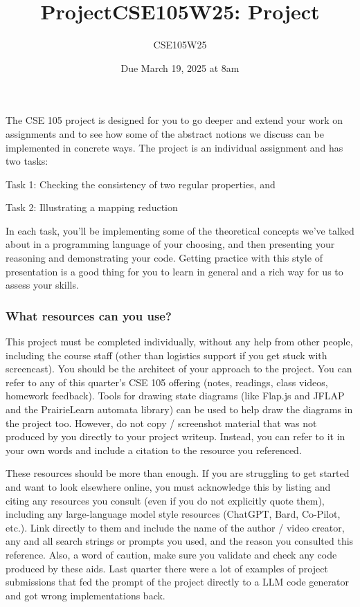 \documentclass[12pt, oneside]{article}
\author{CSE105W25}
\title{ProjectCSE105W25: Project}
\date{Due March 19, 2025 at 8am}
\begin{document}
\maketitle

\thispagestyle{fancy}


\vspace{-20pt}

The CSE 105 project is designed for you to go deeper and 
extend your work on assignments 
and to see how some of the abstract notions we discuss can 
be implemented in concrete ways. 
The project is an individual assignment and has two tasks: 

Task 1: Checking the consistency of two regular properties, and

\vspace{-15pt}

Task 2: Illustrating a mapping reduction

In each task, you'll be implementing some of the theoretical concepts we've talked about in a programming language of your choosing, and then presenting your reasoning and demonstrating your code. Getting practice with this 
style of presentation is a good thing  for you to learn in general and a rich 
way for us to assess your skills. 

\vspace{-20pt}

\subsubsection*{What resources can you use?} This project must be completed individually, 
without any help from other people, including the course staff (other than logistics support if 
you get stuck with screencast). You should be the architect of your approach to the project.
You can refer to any of this quarter's CSE 105 offering (notes, readings, class videos, homework feedback). 
Tools for drawing state diagrams (like Flap.js and JFLAP and the PrairieLearn automata library) can be used to help draw the diagrams 
in the project too. However, do not copy / screenshot material that was not produced by you directly to your project writeup. Instead, you can refer to it in your own words and include a citation to the resource you referenced.

These resources should be more than enough.
If you are struggling to get started and want to look elsewhere online, 
you must acknowledge this by listing and citing any resources you consult 
(even if you do not explicitly quote them), including any large-language model style resources (ChatGPT, Bard, Co-Pilot, etc.). 
Link directly to them and include the name of the author / video creator, 
any and all search strings or prompts you used, and the reason you consulted this reference.  Also, a word of caution, make sure you validate and check 
any code produced by these aids. Last quarter there were a lot of examples
of project submissions that fed the prompt of the project 
directly to a LLM code  generator and got wrong implementations back.
\end{document}
